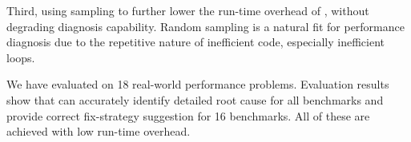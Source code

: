 Third, using sampling to further lower the run-time overhead of \Tool, without
degrading diagnosis capability. Random sampling is a natural fit for performance
diagnosis due to the repetitive nature of inefficient code, especially
inefficient loops.

We have evaluated \Tool on 18 real-world performance problems. 
Evaluation results show that \Tool can accurately identify detailed
root cause for all benchmarks and provide correct fix-strategy suggestion for
16 benchmarks. All of these are achieved with low run-time overhead.
